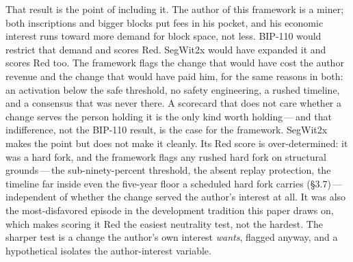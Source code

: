 \documentclass[11pt, twoside, openright]{book}
\newcommand{\sect}[1]{\S#1}
\begin{document}
That result is the point of including it. The author of this framework is a miner; both inscriptions and bigger blocks put fees in his pocket, and his economic interest runs toward more demand for block space, not less. BIP-110 would restrict that demand and scores Red. SegWit2x would have expanded it and scores Red too. The framework flags the change that would have cost the author revenue and the change that would have paid him, for the same reasons in both: an activation below the safe threshold, no safety engineering, a rushed timeline, and a consensus that was never there. A scorecard that does not care whether a change serves the person holding it is the only kind worth holding\,---\,and that indifference, not the BIP-110 result, is the case for the framework. SegWit2x makes the point but does not make it cleanly. Its Red score is over-determined: it was a hard fork, and the framework flags any rushed hard fork on structural grounds\,---\,the sub-ninety-percent threshold, the absent replay protection, the timeline far inside even the five-year floor a scheduled hard fork carries (\sect{3.7})\,---\,independent of whether the change served the author's interest at all. It was also the most-disfavored episode in the development tradition this paper draws on, which makes scoring it Red the easiest neutrality test, not the hardest. The sharper test is a change the author's own interest \textit{wants}, flagged anyway, and a hypothetical isolates the author-interest variable.
\end{document}
